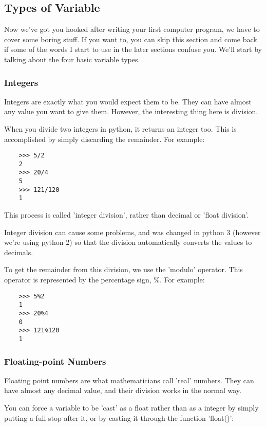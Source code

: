 \subsection{Types of Variable}

Now we've got you hooked after writing your first computer program, we have to
cover some boring stuff. If you want to, you can skip this section and come back
if some of the words I start to use in the later sections confuse you. We'll
start by talking about the four basic variable types.

\subsubsection{Integers}

Integers are exactly what you would expect them to be. They can have almost any
value you want to give them. However, the interesting thing here is division.

When you divide two integers in python, it returns an integer too. This is
accomplished by simply discarding the remainder. For example:

\begin{lstlisting}
    >>> 5/2
    2
    >>> 20/4
    5
    >>> 121/120
    1
\end{lstlisting}

This process is called 'integer division', rather than decimal or 'float
division'.

Integer division can cause some problems, and was changed in python 3 (however
we're using python 2) so that the division automatically converts the values to
decimals.

To get the remainder from this division, we use the 'modulo' operator. This
operator is represented by the percentage sign, \%. For example:

\begin{lstlisting}
    >>> 5%2
    1
    >>> 20%4
    0
    >>> 121%120
    1
\end{lstlisting}

\subsubsection{Floating-point Numbers}

Floating point numbers are what mathematicians call 'real' numbers. They can
have almost any decimal value, and their division works in the normal way.

You can force a variable to be 'cast' as a float rather than as a integer by
simply putting a full stop after it, or by casting it through the function
'float()':

